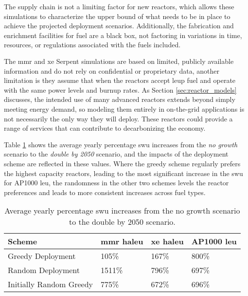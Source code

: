 The supply chain is not a limiting factor for new reactors, which allows these simulations to characterize the upper bound of what needs to be in place to achieve the projected deployment scenarios. Additionally, the fabrication and enrichment facilities for fuel are a black box, not factoring in variations in time, resources, or regulations associated with the fuels included.

The \gls{mmr} and \gls{xe} Serpent simulations are based on limited, publicly available information and do not rely on confidential or proprietary data, another limitation is they assume that when the reactors accept \gls{leup} fuel and operate with the same power levels and burnup rates. As Section \ref{sec:reactor_models} discusses, the intended use of many advanced reactors extends beyond simply meeting energy demand, so modeling them entirely in on-the-grid applications is not necessarily the only way they will deploy. These reactors could provide a range of services that can contribute to decarbonizing the economy.

Table \ref{tab:swu_incs} shows the average yearly percentage \gls{swu} increases from the \textit{no growth} scenario to the \textit{double by 2050} scenario, and the impacts of the deployment scheme are reflected in these values. Where the greedy scheme regularly prefers the highest capacity reactors, leading to the most significant increase in the \gls{swu} for AP1000 \gls{leu}, the randomness in the other two schemes levels the reactor preferences and leads to more consistent increases across fuel types.

\begin{table}[H]
    \centering
    \caption{Average yearly percentage \gls{swu} increases from the no growth scenario to the double by 2050 scenario.}
    \label{tab:swu_incs}
    \begin{tabular}{l l l l}
        \hline
        Scheme & \gls{mmr} \gls{haleu} & \gls{xe} \gls{haleu} & AP1000 \gls{leu}\\
        \hline
        Greedy Deployment & 105\% & 167\% & 800\% \\
        Random Deployment & 1511\% & 796\% & 697\% \\
        Initially Random Greedy & 775\% & 672\% & 696\% \\
        \hline
    \end{tabular}
\end{table}


